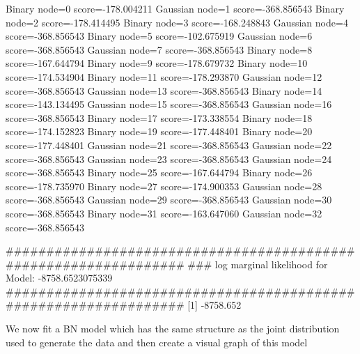 \documentclass[nojss]{jss}
\begin{document}
\begin{Schunk}
\begin{Soutput}
Binary node=0 score=-178.004211
Gaussian node=1 score=-368.856543
Binary node=2 score=-178.414495
Binary node=3 score=-168.248843
Gaussian node=4 score=-368.856543
Binary node=5 score=-102.675919
Gaussian node=6 score=-368.856543
Gaussian node=7 score=-368.856543
Binary node=8 score=-167.644794
Binary node=9 score=-178.679732
Binary node=10 score=-174.534904
Binary node=11 score=-178.293870
Gaussian node=12 score=-368.856543
Gaussian node=13 score=-368.856543
Binary node=14 score=-143.134495
Gaussian node=15 score=-368.856543
Gaussian node=16 score=-368.856543
Binary node=17 score=-173.338554
Binary node=18 score=-174.152823
Binary node=19 score=-177.448401
Binary node=20 score=-177.448401
Gaussian node=21 score=-368.856543
Gaussian node=22 score=-368.856543
Gaussian node=23 score=-368.856543
Gaussian node=24 score=-368.856543
Binary node=25 score=-167.644794
Binary node=26 score=-178.735970
Binary node=27 score=-174.900353
Gaussian node=28 score=-368.856543
Gaussian node=29 score=-368.856543
Gaussian node=30 score=-368.856543
Binary node=31 score=-163.647060
Gaussian node=32 score=-368.856543

   #################################################################
   ###      log marginal likelihood for Model: -8758.6523075339
   #################################################################
[1] -8758.652
\end{Soutput}
\end{Schunk}
We now fit a BN model which has the same structure as the joint distribution used to generate the data and then create a visual graph of this model
\end{document}
